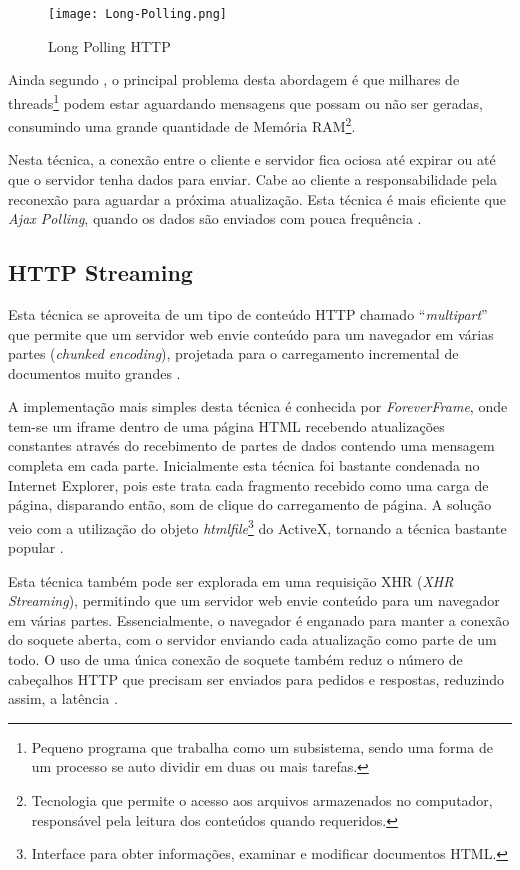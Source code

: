 \begin{figure}[!htb]
	\centering
	\caption{Long Polling HTTP}
	\texttt{[image: Long-Polling.png]}
	\label{fig:longPolling}
\end{figure}

Ainda segundo , o principal problema desta abordagem é que milhares de threads\footnote{Pequeno programa que trabalha como um subsistema, sendo uma forma de um processo se auto dividir em duas ou mais tarefas.} podem estar aguardando mensagens que possam ou não ser geradas, consumindo uma grande quantidade de Memória RAM\footnote{Tecnologia que permite o acesso aos arquivos armazenados no computador, responsável pela leitura dos conteúdos quando requeridos.}.

Nesta técnica, a conexão entre o cliente e servidor fica ociosa até expirar ou até que o servidor tenha dados para enviar. Cabe ao cliente a responsabilidade pela reconexão para aguardar a próxima atualização. Esta técnica é mais eficiente que \emph{Ajax Polling}, quando os dados são enviados com pouca frequência \cite{gutwin2011real}.

\subsection{HTTP Streaming}

Esta técnica se aproveita de um tipo de conteúdo HTTP chamado “\emph{multipart}” que permite que um servidor web envie conteúdo para um navegador em várias partes (\emph{chunked encoding}), projetada para o carregamento incremental de documentos muito grandes \cite{gutwin2011real}.

A implementação mais simples desta técnica é conhecida por \emph{ForeverFrame}, onde tem-se um iframe dentro de uma página HTML recebendo atualizações constantes através do recebimento de partes de dados contendo uma mensagem completa em cada parte. Inicialmente esta técnica foi bastante condenada no Internet Explorer, pois este trata cada fragmento recebido como uma carga de página, disparando então, som de clique do carregamento de página. A solução veio com a utilização do objeto \emph{htmlfile}\footnote{Interface para obter informações, examinar e modificar documentos HTML.} do ActiveX, tornando a técnica bastante popular \cite{souders2009even}.

Esta técnica também pode ser explorada em uma requisição XHR (\emph{XHR Streaming}), permitindo que um servidor web envie conteúdo para um navegador em várias partes. Essencialmente, o navegador é enganado para manter a conexão do soquete aberta, com o servidor enviando cada atualização como parte de um todo. O uso de uma única conexão de soquete também reduz o número de cabeçalhos HTTP que precisam ser enviados para pedidos e respostas, reduzindo assim, a latência \cite{gutwin2011real}.

